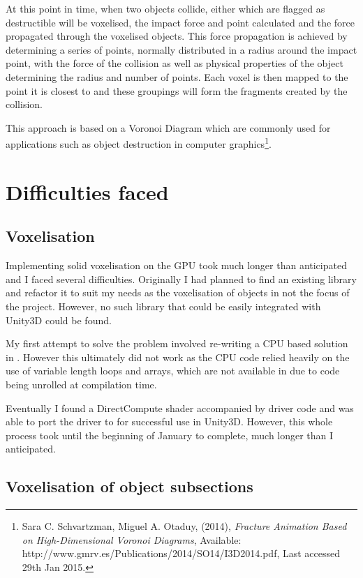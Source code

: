 \documentclass[a4 paper,12pt]{article}
\begin{document}
At this point in time, when two objects collide, either which are flagged as destructible will be voxelised, the impact force and point calculated and the force propagated through the voxelised objects. This force propagation is achieved by determining a series of points, normally distributed in a radius around the impact point, with the force of the collision as well as physical properties of the object determining the radius and number of points. Each voxel is then mapped to the point it is closest to and these groupings will form the fragments created by the collision. 

This approach is based on a Voronoi Diagram which are commonly used for applications such as object destruction in computer graphics\footnote{Sara C. Schvartzman, Miguel A. Otaduy, (2014), \emph{Fracture Animation Based on High-Dimensional Voronoi Diagrams}, Available: http://www.gmrv.es/Publications/2014/SO14/I3D2014.pdf, Last accessed 29th Jan 2015.}.

\section{Difficulties faced}

\subsection*{Voxelisation}

Implementing solid voxelisation on the GPU took much longer than anticipated and I faced several difficulties. Originally I had planned to find an existing library and refactor it to suit my needs as the voxelisation of objects in not the focus of the project. However, no such library that could be easily integrated with Unity3D could be found.

My first attempt to solve the problem involved re-writing a CPU based {} solution in {}. However this ultimately did not work as the CPU code relied heavily on the use of variable length loops and arrays, which are not available in {} due to code being unrolled at compilation time.

Eventually I found a DirectCompute shader accompanied by {} driver code and was able to port the driver to {} for successful use in Unity3D. However, this whole process took until the beginning of January to complete, much longer than I anticipated. 

\subsection*{Voxelisation of object subsections}
\end{document}
